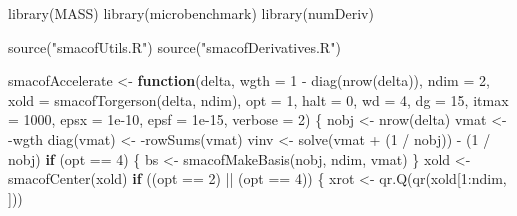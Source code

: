 \documentclass[
  12pt,
  letterpaper,
  DIV=11,
  numbers=noendperiod]{scrartcl}
\newenvironment{Shaded}{\begin{snugshade}}{\end{snugshade}}
\newcommand{\AttributeTok}[1]{\textcolor[rgb]{0.40,0.45,0.13}{#1}}
\newcommand{\ControlFlowTok}[1]{\textcolor[rgb]{0.00,0.23,0.31}{\textbf{#1}}}
\newcommand{\DecValTok}[1]{\textcolor[rgb]{0.68,0.00,0.00}{#1}}
\newcommand{\FloatTok}[1]{\textcolor[rgb]{0.68,0.00,0.00}{#1}}
\newcommand{\FunctionTok}[1]{\textcolor[rgb]{0.28,0.35,0.67}{#1}}
\newcommand{\NormalTok}[1]{\textcolor[rgb]{0.00,0.23,0.31}{#1}}
\newcommand{\OtherTok}[1]{\textcolor[rgb]{0.00,0.23,0.31}{#1}}
\newcommand{\SpecialCharTok}[1]{\textcolor[rgb]{0.37,0.37,0.37}{#1}}
\newcommand{\StringTok}[1]{\textcolor[rgb]{0.13,0.47,0.30}{#1}}
\begin{document}
\begin{Shaded}
\begin{Highlighting}[]
\FunctionTok{library}\NormalTok{(MASS)}
\FunctionTok{library}\NormalTok{(microbenchmark)}
\FunctionTok{library}\NormalTok{(numDeriv)}

\FunctionTok{source}\NormalTok{(}\StringTok{"smacofUtils.R"}\NormalTok{)}
\FunctionTok{source}\NormalTok{(}\StringTok{"smacofDerivatives.R"}\NormalTok{)}

\NormalTok{smacofAccelerate }\OtherTok{\textless{}{-}} \ControlFlowTok{function}\NormalTok{(delta,}
                             \AttributeTok{wgth =} \DecValTok{1} \SpecialCharTok{{-}} \FunctionTok{diag}\NormalTok{(}\FunctionTok{nrow}\NormalTok{(delta)),}
                             \AttributeTok{ndim =} \DecValTok{2}\NormalTok{,}
                             \AttributeTok{xold =} \FunctionTok{smacofTorgerson}\NormalTok{(delta, ndim),}
                             \AttributeTok{opt =} \DecValTok{1}\NormalTok{,}
                             \AttributeTok{halt =} \DecValTok{0}\NormalTok{,}
                             \AttributeTok{wd =} \DecValTok{4}\NormalTok{,}
                             \AttributeTok{dg =} \DecValTok{15}\NormalTok{,}
                             \AttributeTok{itmax =} \DecValTok{1000}\NormalTok{,}
                             \AttributeTok{epsx =} \FloatTok{1e{-}10}\NormalTok{,}
                             \AttributeTok{epsf =} \FloatTok{1e{-}15}\NormalTok{,}
                             \AttributeTok{verbose =} \DecValTok{2}\NormalTok{) \{}
\NormalTok{  nobj }\OtherTok{\textless{}{-}} \FunctionTok{nrow}\NormalTok{(delta)}
\NormalTok{  vmat }\OtherTok{\textless{}{-}} \SpecialCharTok{{-}}\NormalTok{wgth}
  \FunctionTok{diag}\NormalTok{(vmat) }\OtherTok{\textless{}{-}} \SpecialCharTok{{-}}\FunctionTok{rowSums}\NormalTok{(vmat)}
\NormalTok{  vinv }\OtherTok{\textless{}{-}} \FunctionTok{solve}\NormalTok{(vmat }\SpecialCharTok{+}\NormalTok{ (}\DecValTok{1} \SpecialCharTok{/}\NormalTok{ nobj)) }\SpecialCharTok{{-}}\NormalTok{ (}\DecValTok{1} \SpecialCharTok{/}\NormalTok{ nobj)}
  \ControlFlowTok{if}\NormalTok{ (opt }\SpecialCharTok{==} \DecValTok{4}\NormalTok{) \{}
\NormalTok{    bs }\OtherTok{\textless{}{-}} \FunctionTok{smacofMakeBasis}\NormalTok{(nobj, ndim, vmat)}
\NormalTok{  \}}
\NormalTok{  xold }\OtherTok{\textless{}{-}} \FunctionTok{smacofCenter}\NormalTok{(xold)}
  \ControlFlowTok{if}\NormalTok{ ((opt }\SpecialCharTok{==} \DecValTok{2}\NormalTok{) }\SpecialCharTok{||}\NormalTok{ (opt }\SpecialCharTok{==} \DecValTok{4}\NormalTok{)) \{}
\NormalTok{    xrot }\OtherTok{\textless{}{-}} \FunctionTok{qr.Q}\NormalTok{(}\FunctionTok{qr}\NormalTok{(xold[}\DecValTok{1}\SpecialCharTok{:}\NormalTok{ndim, ]))}

\end{Highlighting}
\end{Shaded}
\end{document}
